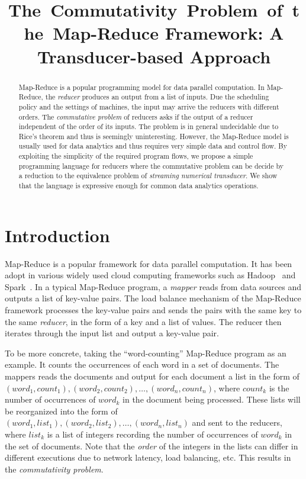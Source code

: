 \documentclass[runningheads,a4paper]{llncs}
\title{The~Commutativity~Problem~of~the~Map-Reduce Framework: A Transducer-based Approach}
\author{}
\institute{}
\begin{document}
\maketitle

\begin{abstract}

Map-Reduce is a popular programming model for data parallel computation. 
In Map-Reduce, the \emph{reducer} produces an output from a list of inputs. Due the scheduling policy and the settings of machines, the input may arrive the reducers with different orders. The \emph{commutative problem} of reducers asks if the output of a reducer independent of the order of its inputs. The problem is in general undecidable due to Rice's theorem and thus is seemingly uninteresting. However, the Map-Reduce model is usually used for data analytics and thus requires very simple data and control flow. 
By exploiting the simplicity of the required program flows, we propose a simple programming language for reducers where the commutative problem can be decide by a reduction to the equivalence problem of \emph{streaming numerical transducer}. 
We show that the language is expressive enough for common data analytics operations.
\end{abstract}

\section{Introduction}
Map-Reduce is a  popular framework for data parallel computation. It has been adopt in various widely used cloud computing frameworks such as Hadoop~\cite{Hadoop} and Spark~\cite{Spark}. In a typical Map-Reduce program, a \emph{mapper} reads from data sources and outputs a list of key-value pairs. The load balance mechanism of the Map-Reduce framework processes the key-value pairs and sends the pairs with the same key to the same \emph{reducer}, in the form of a key and a list of values. The reducer then iterates through the input list and output a key-value pair.

To be more concrete, taking the ``word-counting'' Map-Reduce program as an example. It counts the occurrences of each word in a set of documents. The mappers reads the documents and output for each document a list in the form of $(word_1, count_1), (word_2, count_2), \ldots, (word_n, count_n)$, where $count_k$ is the number of occurrences of $word_k$ in the document being processed. These lists will be reorganized into the form of $(word_1, list_1), (word_2,list_2), \ldots, (word_n,list_n)$ and sent to the reducers, where $list_k$ is a list of integers recording the number of occurrences of $word_k$ in the set of documents. Note that the \emph{order} of the integers in the lists can differ in different executions due to network latency, load balancing, etc.
This results in the \emph{ commutativity problem}.
\end{document}
